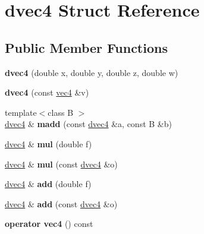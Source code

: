 \hypertarget{structdvec4}{}\section{dvec4 Struct Reference}
\label{structdvec4}
\subsection*{Public Member Functions}
\begin{DoxyCompactItemize}
\item 
\mbox{\label{structdvec4_ab93de338a00979b854d573e372278b49}} 
{\bfseries dvec4} (double x, double y, double z, double w)
\item 
\mbox{\label{structdvec4_a4a888e7f7a75bb9bddb2de2d1000fd0d}} 
{\bfseries dvec4} (const \hyperlink{structvec4}{vec4} \&v)
\item 
\mbox{\label{structdvec4_a8d9971446d9b2cfb65c0b7a0b4e6ddbf}} 
{\footnotesize template$<$class B $>$ }\\\hyperlink{structdvec4}{dvec4} \& {\bfseries madd} (const \hyperlink{structdvec4}{dvec4} \&a, const B \&b)
\item 
\mbox{\label{structdvec4_a1d187803806b58c10dda1ab8c6d30461}} 
\hyperlink{structdvec4}{dvec4} \& {\bfseries mul} (double f)
\item 
\mbox{\label{structdvec4_ab50ba3d2c64c2dd7d7071ee9417c4170}} 
\hyperlink{structdvec4}{dvec4} \& {\bfseries mul} (const \hyperlink{structdvec4}{dvec4} \&o)
\item 
\mbox{\label{structdvec4_a0b90b2bed13253661b4078bc036bcb10}} 
\hyperlink{structdvec4}{dvec4} \& {\bfseries add} (double f)
\item 
\mbox{\label{structdvec4_a4ce11ab75178cbfa4bd44223000fd103}} 
\hyperlink{structdvec4}{dvec4} \& {\bfseries add} (const \hyperlink{structdvec4}{dvec4} \&o)
\item 
\mbox{\label{structdvec4_ad30438204b713a888cc76f6c5593e3a4}} 
{\bfseries operator vec4} () const
\end{DoxyCompactItemize}
